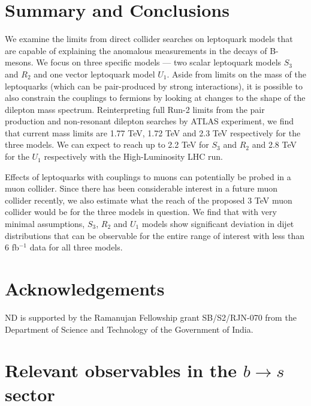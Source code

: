 \documentclass[12pt]{revtex4-2}
\numberwithin{equation}{section}
\begin{document}
\section{Summary and Conclusions}

We examine the limits from direct collider searches on leptoquark models that are capable of explaining the anomalous measurements in the decays of B-mesons.  We focus on three specific models --- two scalar leptoquark models $S_3$ and $R_2$ and one vector leptoquark model $U_1$.  Aside from limits on the mass of the leptoquarks (which can be pair-produced by strong interactions), it is possible to also constrain the couplings to fermions by looking at changes to the shape of the dilepton mass spectrum.  Reinterpreting full Run-2 limits from the pair production and non-resonant dilepton searches by ATLAS experiment, we find that current mass limits are 1.77 TeV, 1.72 TeV and 2.3 TeV respectively for the three models.  We can expect to reach up to 2.2 TeV for $S_3$ and $R_2$ and 2.8 TeV for the $U_1$ respectively with the High-Luminosity LHC run.

Effects of leptoquarks with couplings to muons can potentially be probed in a muon collider.  Since there has been considerable interest in a future muon collider recently, we also estimate what the reach of the proposed 3 TeV muon collider would be for the three models in question.  We find that with very minimal assumptions,  $S_3$, $R_2$ and $U_1$ models show significant deviation in dijet distributions that can be observable for the entire range of interest with less than 6 fb$^{-1}$ data for all three models.


\section*{Acknowledgements}
\noindent ND is supported by the Ramanujan Fellowship grant  SB/S2/RJN-070  from the Department of Science and Technology of the Government of India.



\newpage

\appendix
\section{Relevant observables in the $b\rightarrow s$ sector}
\end{document}
